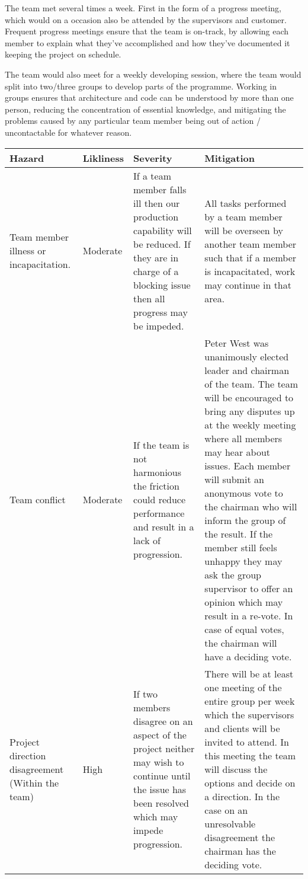 The team met several times a week. First in the form of a progress meeting, which would on a occasion also be attended by the supervisors and customer. Frequent progress meetings ensure that the team is on-track, by allowing each member to explain what they've accomplished and how they've documented it keeping the project on schedule.
 
The team would also meet for a weekly developing session, where the team would split into two/three groups to develop parts of the programme. Working in groups ensures that architecture and code can be understood by more than one person, reducing the concentration of essential knowledge, and mitigating the problems caused by any particular team member being out of action / uncontactable for whatever reason.

\begin{center}
\begin{landscape}
 \begin{longtable}{>{\raggedright}p{3cm} >{\raggedright}p{2cm} >{\raggedright}p{7cm} p{11cm}}
 \toprule
 \textbf{Hazard} &
 \textbf{Likliness} &
 \textbf{Severity} &
 \textbf{Mitigation}\\
     \toprule
        Team member illness or incapacitation. &
        Moderate &
		If a team member falls ill then our production capability will be reduced. If they are in charge of a blocking issue then all progress may be impeded. &
		All tasks performed by a team member will be overseen by another team member such that if a member is incapacitated, work may continue in that area. \\ 
     \midrule
        Team conflict &
        Moderate &
		If the team is not harmonious the friction could reduce performance and result in a lack of progression.  &
		Peter West was unanimously elected leader and chairman of the team. The team will be encouraged to bring any disputes up at the weekly meeting where all members may hear about issues. Each member will submit an anonymous vote to the chairman who will inform the group of the result. If the member still feels unhappy they may ask the group supervisor to offer an opinion which may result in a re-vote. In case of equal votes, the chairman will have a deciding vote. \\ 
     \midrule
        Project direction disagreement (Within the team) &
        High &
		If two members disagree on an aspect of the project neither may wish to continue until the issue has been resolved which may impede progression.  &
		There will be at least one meeting of the entire group per week which the supervisors and clients will be invited to attend. In this meeting the team will discuss the options and decide on a direction. In the case on an unresolvable disagreement the chairman has the deciding vote. \\ 

\end{longtable}
\end{landscape}
\end{center}
